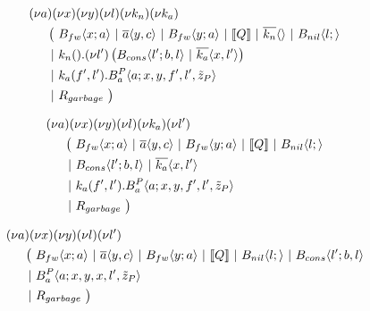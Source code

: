 \begin{align*}
  &\anew{a}{\anew{x}{\anew{y}{\anew{l}{\anew{k_n}{\anew{k_a}{ \\
    &\hspace{0.5cm}
    \begin{aligned}[t]
      \big(\ &\ains{B_{fw}}{x}{a}
      \apar   \asnd{a}{y,c}
      \apar   \ains{B_{fw}}{y}{a}
      \apar   \encMJtoAP{Q}
      \apar   \asnd{k_n}{}
      \apar   \ains{B_{nil}}{l}{}
      \\
      \apar  &\arcv{k_n}{} . \anew{l'}{\parens{\ains{B_{cons}}{l'}{b, l} \apar \asnd{k_a}{x, l'}}}
      \\
      \apar  &\arcv{k_a}{f',l'} . \ains{B_a^P}{a}{x, y, f', l',\tilde{z}_P}
      \\
      \apar  &R_{garbage}
      \ \big)
    \end{aligned}
  }}}}}}
\end{align*}


\begin{align*}
  &\anew{a}{\anew{x}{\anew{y}{\anew{l}{\anew{k_a}{\anew{l'}{ \\
    &\hspace{0.5cm}
    \begin{aligned}[t]
      \big(\ &\ains{B_{fw}}{x}{a}
      \apar   \asnd{a}{y,c}
      \apar   \ains{B_{fw}}{y}{a}
      \apar   \encMJtoAP{Q}
      \apar   \ains{B_{nil}}{l}{}
      \\
      \apar  &\ains{B_{cons}}{l'}{b, l}
      \apar   \asnd{k_a}{x, l'}
      \\
      \apar  &\arcv{k_a}{f',l'} . \ains{B_a^P}{a}{x, y, f', l',\tilde{z}_P}
      \\
      \apar  &R_{garbage}
      \ \big)
    \end{aligned}
  }}}}}}
\end{align*}


\begin{align*}
  &\anew{a}{\anew{x}{\anew{y}{\anew{l}{\anew{l'}{ \\
    &\hspace{0.5cm}
    \begin{aligned}[t]
      \big(\ &\ains{B_{fw}}{x}{a}
      \apar   \asnd{a}{y,c}
      \apar   \ains{B_{fw}}{y}{a}
      \apar   \encMJtoAP{Q}
      \apar   \ains{B_{nil}}{l}{}
      \apar   \ains{B_{cons}}{l'}{b, l}
      \\
      \apar  &\ains{B_a^P}{a}{x, y, x, l',\tilde{z}_P}
      \\
      \apar  &R_{garbage}
      \ \big)
    \end{aligned}
  }}}}}
\end{align*}

